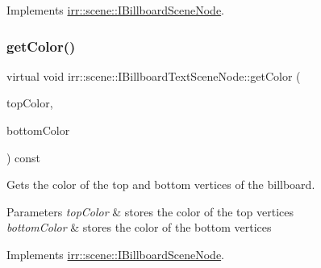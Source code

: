 Implements \hyperlink{classirr_1_1scene_1_1IBillboardSceneNode_a0b2729cc4913b0890ae28cf0ef0ab949}{irr\+::scene\+::\+I\+Billboard\+Scene\+Node}.

\mbox{\label{classirr_1_1scene_1_1IBillboardTextSceneNode_ac142a04e455811d5a3efa47ce2499d18}} 
\subsubsection{\texorpdfstring{get\+Color()}{getColor()}\hspace{0.1cm}{\footnotesize\ttfamily [2/2]}}
{\footnotesize\ttfamily virtual void irr\+::scene\+::\+I\+Billboard\+Text\+Scene\+Node\+::get\+Color (\begin{DoxyParamCaption}\item[{\hyperlink{classirr_1_1video_1_1SColor}{video\+::\+S\+Color} \&}]{top\+Color,  }\item[{\hyperlink{classirr_1_1video_1_1SColor}{video\+::\+S\+Color} \&}]{bottom\+Color }\end{DoxyParamCaption}) const\hspace{0.3cm}{\ttfamily [pure virtual]}}



Gets the color of the top and bottom vertices of the billboard. 


\begin{DoxyParams}{Parameters}
{\em top\+Color} & stores the color of the top vertices \\
\hline
{\em bottom\+Color} & stores the color of the bottom vertices \\
\hline
\end{DoxyParams}


Implements \hyperlink{classirr_1_1scene_1_1IBillboardSceneNode_a0b2729cc4913b0890ae28cf0ef0ab949}{irr\+::scene\+::\+I\+Billboard\+Scene\+Node}.

\mbox{\label{classirr_1_1scene_1_1IBillboardTextSceneNode_aaa65d10d3a49206728c47b148a64bb4a}} 
